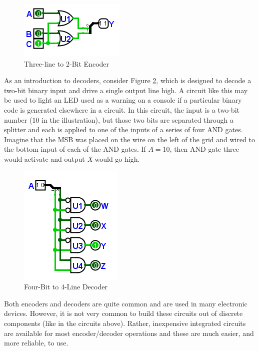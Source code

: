 \begin{figure}[H]
	\centering
	\includegraphics[width=\maxwidth{.95\linewidth}]{gfx/08_14}
	\caption{Three-line to 2-Bit Encoder}
	\label{fig:08_14}
\end{figure}
 
As an introduction to decoders, consider Figure \ref{fig:08_15}, which is designed to decode a two-bit binary input and drive a single output line high. A circuit like this may be used to light an \ac{LED} used as a warning on a console if a particular binary code is generated elsewhere in a circuit. In this circuit, the input is a two-bit number ($ 10 $ in the illustration), but those two bits are separated through a splitter and each is applied to one of the inputs of a series of four \textsf{AND} gates. Imagine that the \ac{MSB} was placed on the wire on the left of the grid and wired to the bottom input of each of the \textsf{AND} gates. If $ A=10 $, then \textsf{AND} gate three would activate and output \emph{X} would go high.

\begin{figure}[H]
	\centering
	\includegraphics[width=\maxwidth{.95\linewidth}]{gfx/08_15}
	\caption{Four-Bit to 4-Line Decoder}
	\label{fig:08_15}
\end{figure}

Both encoders and decoders are quite common and are used in many electronic devices. However, it is not very common to build these circuits out of discrete components (like in the circuits above). Rather, inexpensive integrated circuits are available for most encoder/decoder operations and these are much easier, and more reliable, to use. 

